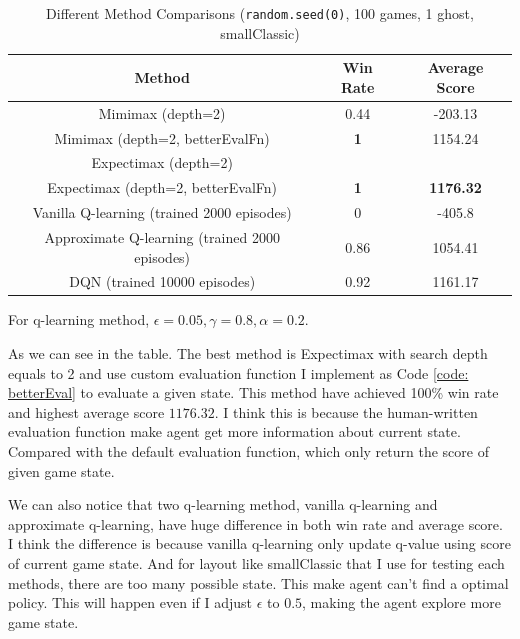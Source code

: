 \documentclass{article}[12pt]
\begin{document}
\begin{table}[H]
\centering
\caption{Different Method Comparisons (\texttt{random.seed(0)}, 100 games, 1 ghost, smallClassic)}
\begin{tabular}{ccc} 
\toprule
\textbf{Method}                      & \textbf{Win Rate} & \textbf{Average Score}  \\ 
\hline
Mimimax (depth=2)                    & 0.44              & -203.13                 \\
Mimimax (depth=2,
  betterEvalFn)    & \textbf{1}        & 1154.24                 \\
Expectimax (depth=2)                 &                   &                         \\
Expectimax (depth=2,
  betterEvalFn) & \textbf{1}        & \textbf{1176.32}        \\
Vanilla Q-learning (trained 2000 episodes)                  & 0                 & -405.8                  \\
Approximate Q-learning (trained 2000 episodes)               & 0.86              & 1054.41                 \\
DQN (trained 10000 episodes)                                 & 0.92              & 1161.17                 \\
\bottomrule
\end{tabular}
\end{table}

For q-learning method, $\epsilon=0.05, \gamma=0.8, \alpha=0.2$.

As we can see in the table. The best method is Expectimax with search depth equals to 2 and use custom evaluation function I implement as Code \ref{code: betterEval} to evaluate a given state. This method have achieved 100\% win rate and highest average score $1176.32$. I think this is because the human-written evaluation function make agent get more information about current state. Compared with the default evaluation function, which only return the score of given game state.

We can also notice that two q-learning method, vanilla q-learning and approximate q-learning, have huge difference in both win rate and average score. I think the difference is because vanilla q-learning only update q-value using score of current game state. And for layout like smallClassic that I use for testing each methods, there are too many possible state. This make agent can't find a optimal policy. This will happen even if I adjust $\epsilon$ to $0.5$, making the agent explore more game state. 
\end{document}
